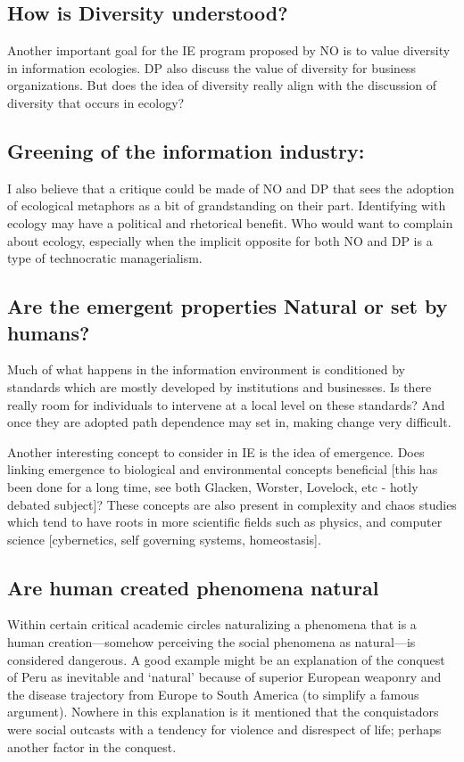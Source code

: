 \subsection{How is Diversity understood?}

Another important goal for the IE program proposed by NO is to value diversity in information ecologies. DP also discuss the value of diversity for business organizations. But does the idea of diversity really align with the discussion of diversity that occurs in ecology?

\subsection{Greening of the information industry:}

I also believe that a critique could be made of NO and DP that sees the adoption of ecological metaphors as a bit of grandstanding on their part. Identifying with ecology may have a political and rhetorical benefit. Who would want to complain about ecology, especially when the implicit opposite for both NO and DP is a type of technocratic managerialism.

\subsection{Are the emergent properties Natural or set by humans?}

Much of what happens in the information environment is conditioned by standards which are mostly developed by institutions and businesses. Is there really room for individuals to intervene at a local level on these standards? And once they are adopted path dependence may set in, making change very difficult.

Another interesting concept to consider in IE is the idea of emergence. Does linking emergence to biological and environmental concepts beneficial [this has been done for a long time, see both Glacken, Worster, Lovelock, etc - hotly debated subject]? These concepts are also present in complexity and chaos studies which tend to have roots in more scientific fields such as physics, and computer science [cybernetics, self governing systems, homeostasis].

\subsection{Are human created phenomena natural}

Within certain critical academic circles naturalizing a phenomena that is a human creation—somehow perceiving the social phenomena as natural—is considered dangerous. A good example might be an explanation of the conquest of Peru as inevitable and ‘natural’ because of superior European weaponry and the disease trajectory from Europe to South America (to simplify a famous argument). Nowhere in this explanation is it mentioned that the conquistadors were social outcasts with a tendency for violence and disrespect of life; perhaps another factor in the conquest. 

